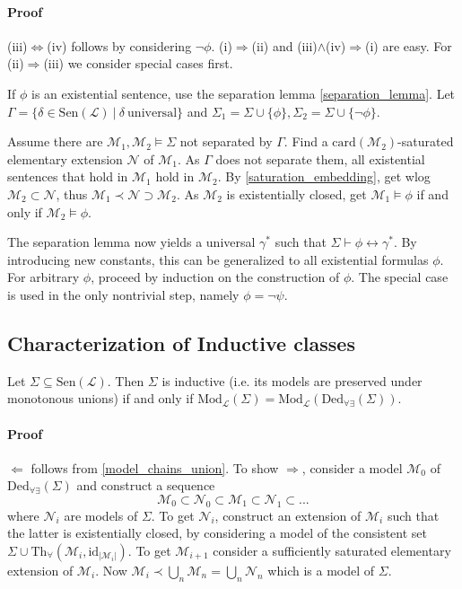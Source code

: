 \documentclass{scrartcl}
\begin{document}
\paragraph{Proof} (iii)$\Leftrightarrow$(iv) follows by considering $\neg\phi$. (i)$\Rightarrow$(ii) and (iii)$\wedge$(iv)$\Rightarrow$(i) are easy. For (ii)$\Rightarrow$(iii) we consider special cases first.

If $\phi$ is an existential sentence, use the separation lemma \ref{separation_lemma}.
Let $\Gamma = \{ \delta \in \mathrm{Sen}(\mathcal{L}) \ | \ \delta \ \text{universal} \}$ and $\Sigma_1 = \Sigma \cup \{ \phi \}, \Sigma_2 = \Sigma \cup \{ \neg \phi \}$.

Assume there are $\mathcal{M}_1, \mathcal{M}_2 \models \Sigma$ not separated by $\Gamma$.
Find a $\mathrm{card}(\mathcal{M}_2)$-saturated elementary extension $\mathcal{N}$ of $\mathcal{M}_1$.
As $\Gamma$ does not separate them, all existential sentences that hold in $\mathcal{M}_1$ hold in $\mathcal{M}_2$.
By \ref{saturation_embedding}, get wlog $\mathcal{M}_2 \subset \mathcal{N}$, thus $\mathcal{M}_1 \prec \mathcal{N} \supset \mathcal{M}_2$.
As $\mathcal{M}_2$ is existentially closed, get $\mathcal{M}_1 \models \phi$ if and only if $\mathcal{M}_2 \models \phi$.

The separation lemma now yields a universal $\gamma^*$ such that $\Sigma \vdash \phi \leftrightarrow \gamma^*$.
By introducing new constants, this can be generalized to all existential formulas $\phi$.
For arbitrary $\phi$, proceed by induction on the construction of $\phi$. The special case is used in the only nontrivial step, namely $\phi = \neg \psi$.

\subsection{Characterization of Inductive classes}
Let $\Sigma \subseteq \mathrm{Sen}(\mathcal{L})$. 
Then $\Sigma$ is inductive (i.e. its models are preserved under monotonous unions) if and only if $\mathrm{Mod}_{\mathcal{L}}(\Sigma) = \mathrm{Mod}_{\mathcal{L}}(\mathrm{Ded}_{\forall\exists}(\Sigma))$.
\paragraph{Proof} $\Leftarrow$ follows from \ref{model_chains_union}. To show $\Rightarrow$, consider a model $\mathcal{M}_0$ of $\mathrm{Ded}_{\forall\exists}(\Sigma)$ and construct a sequence
\begin{equation*}
    \mathcal{M}_0 \subset \mathcal{N}_0 \subset \mathcal{M}_1 \subset \mathcal{N}_1 \subset ...
\end{equation*}
where $\mathcal{N}_i$ are models of $\Sigma$. 
To get $\mathcal{N}_i$, construct an extension of $\mathcal{M}_i$ such that the latter is existentially closed, by considering a model of the consistent set $\Sigma \cup \mathrm{Th}_\forall(\mathcal{M}_i, \mathrm{id}_{|\mathcal{M}_i|})$.
To get $\mathcal{M}_{i + 1}$ consider a sufficiently saturated elementary extension of $\mathcal{M}_i$.
Now $\mathcal{M}_i \prec \bigcup_n \mathcal{M}_n = \bigcup_n \mathcal{N}_n$ which is a model of $\Sigma$.
\end{document}
